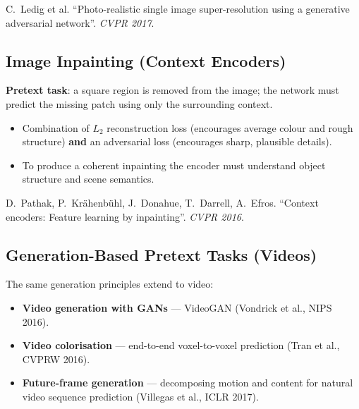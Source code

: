 \documentclass[11pt,a4paper]{article}
\theoremstyle{definition}
\theoremstyle{plain}
\theoremstyle{remark}
\begin{document}
\begin{tcolorbox}[colback=blue!5!white,colframe=blue!60!black,title={Reference}]
C.\ Ledig et al. ``Photo-realistic single image super-resolution using a generative adversarial network''. \textit{CVPR 2017}.
\end{tcolorbox}

\subsection{Image Inpainting (Context Encoders)}

\textbf{Pretext task}: a square region is removed from the image; the network must predict the missing patch using only the surrounding context.

\begin{itemize}
    \item Combination of $L_2$ reconstruction loss (encourages average colour and rough structure) \textbf{and} an adversarial loss (encourages sharp, plausible details).
    \item To produce a coherent inpainting the encoder must understand object structure and scene semantics.
\end{itemize}

\begin{tcolorbox}[colback=blue!5!white,colframe=blue!60!black,title={Reference}]
D.\ Pathak, P.\ Krähenbühl, J.\ Donahue, T.\ Darrell, A.\ Efros. ``Context encoders: Feature learning by inpainting''. \textit{CVPR 2016}.
\end{tcolorbox}

\subsection{Generation-Based Pretext Tasks (Videos)}

The same generation principles extend to video:

\begin{itemize}
    \item \textbf{Video generation with GANs} --- VideoGAN (Vondrick et al., NIPS 2016).
    \item \textbf{Video colorisation} --- end-to-end voxel-to-voxel prediction (Tran et al., CVPRW 2016).
    \item \textbf{Future-frame generation} --- decomposing motion and content for natural video sequence prediction (Villegas et al., ICLR 2017).
\end{itemize}
\end{document}
